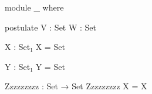 \documentclass{article}
\begin{document}
\begin{AgdaSuppressSpace}
\begin{code}
module _ where
\end{code}
\begin{code}
  postulate V : Set
            W : Set
\end{code}
\end{AgdaSuppressSpace}

\begin{code}
X : Set₁
X =
  Set
\end{code}

\begin{code}
Y : Set₁
Y =       Set

Zzzzzzzzz : Set → Set
Zzzzzzzzz X
          = X
\end{code}
\end{document}
